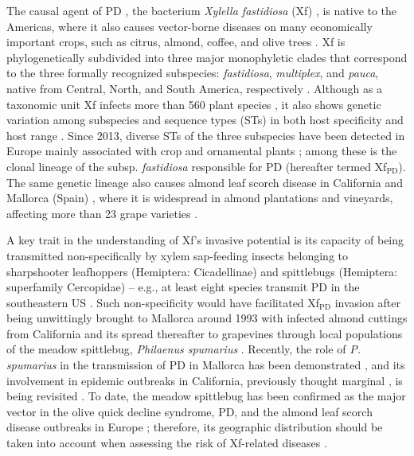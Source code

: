 The causal agent of PD \cite{Davis1978}, the bacterium \textit{Xylella
    fastidiosa} (Xf) \cite{Wells1987}, is native to the Americas, where it also
causes vector-borne diseases on many economically important crops, such as
citrus, almond, coffee, and olive trees \cite{Almeida2015, Almeida2019}. Xf is
phylogenetically subdivided into three major monophyletic clades that
correspond to the three formally recognized subspecies: \textit{fastidiosa},
\textit{multiplex}, and \textit{pauca}, native from Central, North, and South
America, respectively \cite{Sicard2018,Vanhove2019}. Although as a taxonomic
unit Xf infects more than 560 plant species \cite{Delbianco2019}, it also shows
genetic variation among subspecies and sequence types (STs) in both host
specificity and host range \cite{Nunney2019}. Since 2013, diverse STs of the
three subspecies have been detected in Europe mainly associated with crop and
ornamental plants \cite{Denance2017, Olmo2017, Saponari2013}; among these is
the clonal lineage of the subsp. \textit{fastidiosa} responsible for PD
(hereafter termed Xf$_{\textrm{PD}}$). The same genetic lineage also causes
almond leaf scorch disease in California \cite{Almeida2003} and Mallorca
(Spain) \cite{Moralejo2020}, where it is widespread in almond plantations and
vineyards, affecting more than 23 grape varieties \cite{Moralejo2019}.

A key trait in the understanding of Xf's invasive potential is its capacity of
being transmitted non-specifically by xylem sap-feeding insects belonging to
sharpshooter leafhoppers (Hemiptera: Cicadellinae) and spittlebugs (Hemiptera:
superfamily Cercopidae) \cite{Almeida2016, Cornara2018} -- e.g., at least eight
species transmit PD in the southeastern US \cite{Overall2017}. Such
non-specificity would have facilitated Xf$_{\textrm{PD}}$ invasion after being
unwittingly brought to Mallorca around 1993 with infected almond cuttings from
California and its spread thereafter to grapevines through local populations of
the meadow spittlebug, \textit{Philaenus spumarius} \cite{Moralejo2020}.
Recently, the role of \textit{P. spumarius} in the transmission of PD in
Mallorca has been demonstrated \cite{Moralejo2019}, and its involvement in
epidemic outbreaks in California, previously thought marginal \cite{Redak2004,
    Severin1950}, is being revisited \cite{Cornara2016, Beal2021}. To date, the
meadow spittlebug has been confirmed as the major vector in the olive quick
decline syndrome, PD, and the almond leaf scorch disease outbreaks in Europe
\cite{Cornara2018, Cornara2019,Moralejo2019, Moralejo2020}; therefore, its
geographic distribution should be taken into account when assessing the risk of
Xf-related diseases \cite{Godefroid2021}.

